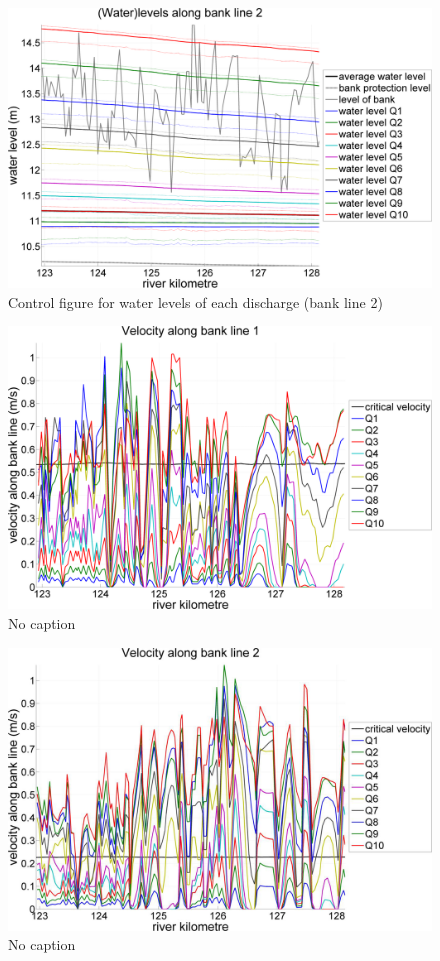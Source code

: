 \begin{figure}
\includegraphics[width=\textwidth]{figures/Fig2-9.png}
\caption{Control figure for water levels of each discharge (bank line 2)}
\label{Fig2.9}
\end{figure}

\begin{figure}
\includegraphics[width=\textwidth]{figures/Fig2-10.png}
\caption{No caption}
\label{Fig2.10}
\end{figure}

\begin{figure}
\includegraphics[width=\textwidth]{figures/Fig2-11.png}
\caption{No caption}
\label{Fig2.11}
\end{figure}

